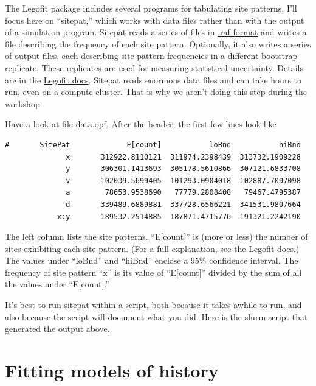 \documentclass[11pt]{article}
\begin{document}
The Legofit package includes several programs for tabulating site
patterns. I'll focus here on ``sitepat,'' which works with data files
rather than with the output of a simulation program. Sitepat reads a
series of files in
\href{http://alanrogers.github.io/legofit/html/index.html#sitepattern}{.raf
  format} and writes a file describing the frequency of each site
pattern. Optionally, it also writes a series of output files, each
describing site pattern frequencies in a different
\href{https://en.wikipedia.org/wiki/Bootstrapping_(statistics)}{bootstrap
  replicate}. These replicates are used for measuring statistical
uncertainty. Details are in the
\href{https://alanrogers.github.io/legofit/html/sitepat.html}{Legofit
  docs}. Sitepat reads enormous data files and can take hours to run,
even on a compute cluster. That is why we aren't doing this step
during the workshop.

Have a look at file
\href{https://github.com/alanrogers/agar22/blob/main/6_legofit/europe/data.opf}{data.opf}. After
the header, the first few lines look like
\begin{verbatim}
#       SitePat             E[count]           loBnd           hiBnd
              x       312922.8110121  311974.2398439  313732.1909228
              y       306301.1413693  305178.5610866  307121.6833708
              v       102039.5699405  101293.0904018  102887.7097098
              a        78653.9538690   77779.2808408   79467.4795387
              d       339489.6889881  337728.6566221  341531.9807664
            x:y       189532.2514885  187871.4715776  191321.2242190
\end{verbatim}
The left column lists the site patterns. ``E[count]'' is (more or
less) the number of sites exhibiting each site pattern. (For a full
explanation, see the
\href{https://alanrogers.github.io/legofit/html/index.html#sitepattern}{Legofit
  docs}.) The values under ``loBnd'' and ``hiBnd'' enclose a 95\%
confidence interval. The frequency of site pattern ``x'' is its value
of ``E[count]'' divided by the sum of all the values under ``E[count].''

It's best to run sitepat within a script, both because it takes awhile
to run, and also because the script will document what you did.
\href{https://github.com/alanrogers/agar22/blob/main/6_legofit/europe/sitepat.slr}{Here}
is the slurm script that generated the output above.

\section{Fitting models of history}
\label{sec.fit}
\end{document}
